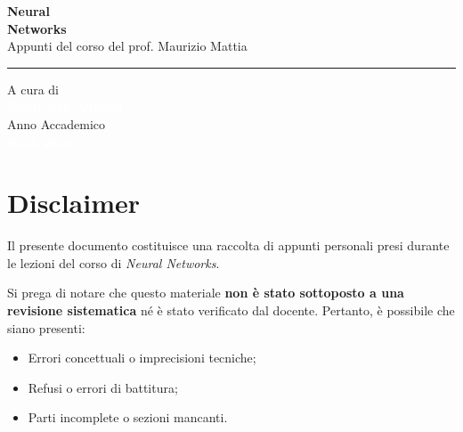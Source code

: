 \documentclass[12pt, a4paper, openany]{book} %
\begin{document}
\begin{titlepage}
\begin{flushleft}
        \vspace{4.5cm}
        
        \textcolor{colorE}{\sffamily\fontsize{60}{70}\selectfont\textbf{Neural}}\\[0.1cm]
        \textcolor{colorE}{\sffamily\fontsize{60}{70}\selectfont\textbf{Networks}}\\[0.6cm]
        \textcolor{white!80}{\sffamily\Large Appunti del corso del prof. Maurizio Mattia}\\[0.5cm]
        \textcolor{white!30}{\rule{6cm}{1pt}} %
    \end{flushleft}
    
    \vfill %
    
    \begin{flushleft}
        \textcolor{white!60}{\sffamily\large A cura di}\\[0.2cm]
        \textcolor{white}{\sffamily\huge\textbf{Elisabetta Agnello}}\\[1.2cm]
        
        \textcolor{white!60}{\sffamily\large Anno Accademico}\\[0.2cm]
        \textcolor{white}{\sffamily\Large\textbf{2023/2024}}
    \end{flushleft}
    
    \vspace*{1cm} %
\end{titlepage}
    

\frontmatter %

\chapter*{Disclaimer}
\thispagestyle{empty} %

Il presente documento costituisce una raccolta di appunti personali presi durante le lezioni del corso di \textit{Neural Networks}. 

Si prega di notare che questo materiale \textbf{non è stato sottoposto a una revisione sistematica} né è stato verificato dal docente. Pertanto, è possibile che siano presenti:
\begin{itemize}
    \item Errori concettuali o imprecisioni tecniche;
    \item Refusi o errori di battitura;
    \item Parti incomplete o sezioni mancanti.
\end{itemize}
\end{document}
